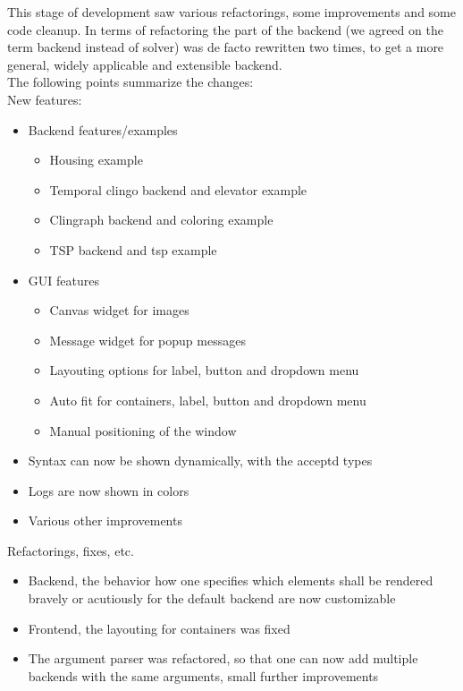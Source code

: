 \documentclass[12pt,a4paper]{article}
\newcommand{\<}[1]{\guilsinglleft}
\renewcommand{\>}[1]{\guilsinglright}
\begin{document}
This stage of development saw various refactorings, some improvements and some code cleanup. In terms of refactoring the part of the backend (we agreed on the term backend instead of solver) was de facto rewritten two times, to get a more general, widely applicable and extensible backend.\\
The following points summarize the changes:\\[1em]
New features:
\begin{itemize}
    \item Backend features/examples
    \begin{itemize}
        \item Housing example
        \item Temporal clingo backend and elevator example
        \item Clingraph backend and coloring example
        \item TSP backend and tsp example
    \end{itemize}
    \item GUI features
    \begin{itemize}
        \item Canvas widget for images
        \item Message widget for popup messages
        \item Layouting options for label, button and dropdown menu
        \item Auto fit for containers, label, button and dropdown menu
        \item Manual positioning of the window
    \end{itemize}
    \item Syntax can now be shown dynamically, with the acceptd types
    \item Logs are now shown in colors
    \item Various other improvements
\end{itemize}

\noindent Refactorings, fixes, etc.
\begin{itemize}
    \item Backend, the behavior how one specifies which elements shall be rendered bravely or acutiously for the default backend are now customizable
    \item Frontend, the layouting for containers was fixed
    \item The argument parser was refactored, so that one can now add multiple backends with the same arguments, small further improvements
\end{itemize}
\end{document}
